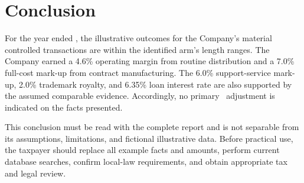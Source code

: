 \chapter{Conclusion}
For the year ended \FiscalYearEnd, the illustrative outcomes for the Company's
material controlled transactions are within the identified arm's length ranges.
The Company earned a 4.6\% operating margin from routine distribution and a 7.0\%
full-cost mark-up from contract manufacturing. The 6.0\% support-service mark-up,
2.0\% trademark royalty, and 6.35\% loan interest rate are also supported by the
assumed comparable evidence. Accordingly, no primary \TP\ adjustment is
indicated on the facts presented.

This conclusion must be read with the complete report and is not separable from
its assumptions, limitations, and fictional illustrative data. Before practical
use, the taxpayer should replace all example facts and amounts, perform current
database searches, confirm local-law requirements, and obtain appropriate tax
and legal review.

\appendix
